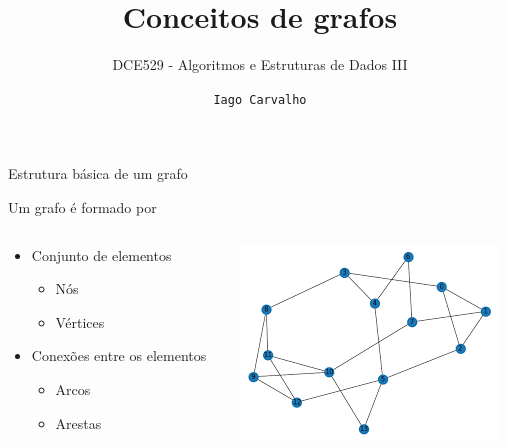 \documentclass[compress,mathserif]{beamer}
\title{Conceitos de grafos}
\subtitle{DCE529 - Algoritmos e Estruturas de Dados III}
\author{\texttt{Iago Carvalho}}
\institute{\texttt{Departamento de Ciência da Computação}}
\begin{document}
\begin{frame}
\titlepage

\end{frame}


\begin{frame}{Estrutura básica de um grafo}

Um grafo é formado por

\begin{columns}[T]
    \begin{column}{.44\textwidth}
        \begin{itemize}
            \item Conjunto de elementos
            \begin{itemize}
                \item Nós
                \item Vértices
            \end{itemize}
            \item Conexões entre os elementos
            \begin{itemize}
                \item Arcos
                \item Arestas
            \end{itemize}
        \end{itemize}
    \end{column}
    \begin{column}{.54\textwidth}
        \centering \includegraphics[width=\textwidth]{images/grafo.png}
    \end{column}
\end{columns}


\end{frame}
\end{document}
